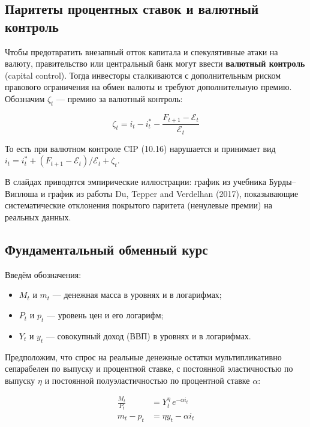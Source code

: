 \documentclass[10pt,a4paper]{article}
\begin{document}
\subsection{Паритеты процентных ставок и валютный контроль}

Чтобы предотвратить внезапный отток капитала и спекулятивные атаки на валюту, правительство или центральный банк могут ввести \textbf{валютный контроль} (capital control). Тогда инвесторы сталкиваются с дополнительным риском правового ограничения на обмен валюты и требуют дополнительную премию. Обозначим $\zeta_t$ — премию за валютный контроль:
\begin{formulabox}
\begin{equation}
\zeta_t = i_t - i^{*}_t - \frac{F_{t+1}-\mathcal{E}_t}{\mathcal{E}_t} \tag{10.19}
\end{equation}
\end{formulabox}
То есть при валютном контроле CIP (10.16) нарушается и принимает вид $i_t = i^{*}_t + (F_{t+1}-\mathcal{E}_t)/\mathcal{E}_t + \zeta_t$.

В слайдах приводятся эмпирические иллюстрации: график из учебника Бурды--Виплоша и график из работы Du, Tepper and Verdelhan (2017), показывающие систематические отклонения покрытого паритета (ненулевые премии) на реальных данных.

\subsection{Фундаментальный обменный курс}

Введём обозначения:
\begin{itemize}[leftmargin=1.3em]
\item $M_t$ и $m_t$ — денежная масса в уровнях и в логарифмах;
\item $P_t$ и $p_t$ — уровень цен и его логарифм;
\item $Y_t$ и $y_t$ — совокупный доход (ВВП) в уровнях и в логарифмах.
\end{itemize}
Предположим, что спрос на реальные денежные остатки мультипликативно сепарабелен по выпуску и процентной ставке, с постоянной эластичностью по выпуску $\eta$ и постоянной полуэластичностью по процентной ставке $\alpha$:
\begin{formulabox}
\begin{align}
\frac{M_t}{P_t} &= Y_t^{\eta}\,e^{-\alpha i_t} \tag{10.20}\\
m_t - p_t &= \eta y_t - \alpha i_t \tag{10.21}
\end{align}
\end{formulabox}
\end{document}
